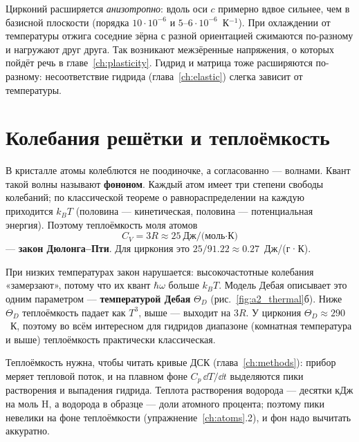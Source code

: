 
\begin{zrbox}
Цирконий расширяется \emph{анизотропно}: вдоль оси $c$ примерно вдвое сильнее, чем в базисной плоскости (порядка
$10\cdot10^{-6}$ и $5$--$6\cdot10^{-6}$~К$^{-1}$). При охлаждении от температуры отжига соседние зёрна с разной
ориентацией сжимаются по-разному и нагружают друг друга. Так возникают межзёренные напряжения, о которых пойдёт
речь в главе~\ref{ch:plasticity}. Гидрид и матрица тоже расширяются по-разному: несоответствие гидрида
(глава~\ref{ch:elastic}) слегка зависит от температуры.
\end{zrbox}

\section{Колебания решётки и теплоёмкость}

В кристалле атомы колеблются не поодиночке, а согласованно --- волнами. Квант такой волны называют
\textbf{фононом}. Каждый атом имеет три степени свободы колебаний; по классической теореме о равнораспределении на
каждую приходится $k_BT$ (половина --- кинетическая, половина --- потенциальная энергия). Поэтому теплоёмкость моля
атомов
\begin{equation}
C_V = 3R \approx 25~\text{Дж/(моль·К)}
\end{equation}
--- \textbf{закон Дюлонга--Пти}. Для циркония это $25/91.22\approx0.27$~Дж/(г·К).

При низких температурах закон нарушается: высокочастотные колебания «замерзают», потому что их квант
$\hbar\omega$ больше $k_BT$. Модель Дебая описывает это одним параметром --- \textbf{температурой Дебая}
$\Theta_D$ (рис.~\ref{fig:a2_thermal}б). Ниже $\Theta_D$ теплоёмкость падает как $T^3$, выше --- выходит на $3R$. У
циркония $\Theta_D\approx290$~К, поэтому во всём интересном для гидридов диапазоне (комнатная температура и выше)
теплоёмкость практически классическая.

\begin{zrbox}
Теплоёмкость нужна, чтобы читать кривые ДСК (глава~\ref{ch:methods}): прибор меряет тепловой поток, и на
плавном фоне $C_p\,\dd T/\dd t$ выделяются пики растворения и выпадения гидрида. Теплота растворения водорода
--- десятки кДж на моль H, а водорода в образце --- доли атомного процента; поэтому пики невелики на фоне
теплоёмкости (упражнение~\ref{ch:atoms}.2), и фон надо вычитать аккуратно.
\end{zrbox}

